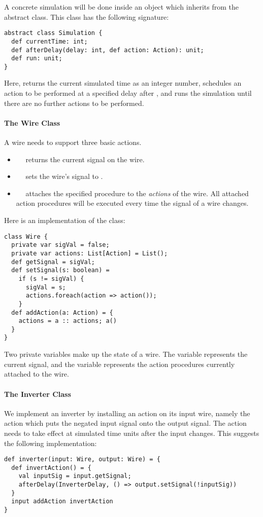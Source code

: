 \documentclass[a4paper,12pt,twoside,titlepage]{book}
\begin{document}
{A concrete simulation will be done inside an object which inherits
from the abstract  class. This class has the following
signature:

\begin{lstlisting}
abstract class Simulation {
  def currentTime: int;
  def afterDelay(delay: int, def action: Action): unit;
  def run: unit;
}
\end{lstlisting}
Here,
 returns the current simulated time as an integer
number,
 schedules an action to be performed at a specified
delay after , and
 runs the simulation until there are no further actions to be 
performed.

\paragraph{The Wire Class}
A wire needs to support three basic actions.
\begin{itemize}
\item[]
~~ returns the current signal on the wire.
\item[]
~~ sets the wire's signal to .
\item[]
~~ attaches the specified procedure
 to the {\em actions} of the wire. All attached action
procedures will be executed every time the signal of a wire changes.
\end{itemize}
Here is an implementation of the  class:
\begin{lstlisting}
class Wire {
  private var sigVal = false;
  private var actions: List[Action] = List();
  def getSignal = sigVal;
  def setSignal(s: boolean) = 
    if (s != sigVal) {
      sigVal = s;
      actions.foreach(action => action()); 
    }
  def addAction(a: Action) = {
    actions = a :: actions; a()
  }
}
\end{lstlisting}
Two private variables make up the state of a wire.  The variable
 represents the current signal, and the variable
 represents the action procedures currently attached to
the wire.

\paragraph{The Inverter Class}
We implement an inverter by installing an action on its input wire,
namely the action which puts the negated input signal onto the output
signal.  The action needs to take effect at 
simulated time units after the input changes. This suggests the 
following implementation:
\begin{lstlisting}
def inverter(input: Wire, output: Wire) = {
  def invertAction() = {
    val inputSig = input.getSignal;
    afterDelay(InverterDelay, () => output.setSignal(!inputSig))
  }
  input addAction invertAction
}
\end{lstlisting}

}
\end{document}
